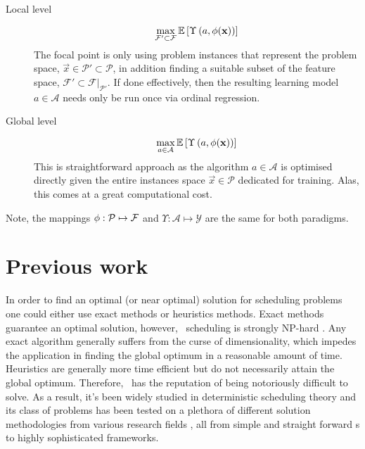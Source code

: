 \begin{description}
  \item[Local level] 
  \begin{equation}
    \max_{\mathcal{F}'\subset\mathcal{F}} 
    \mathbb{E}\left[\Upsilon\left(a,{\mathbf{\phi}}(\mathbf{x})\right)\right]
  \end{equation}
  The  focal point is only using  problem instances that represent the problem 
  space, $\vec{x}\in\mathcal{P'}\subset\mathcal{P}$, in addition finding a 
  suitable subset of the feature space, 
  $\mathcal{F}'\subset\mathcal{F}|_{\mathcal{P}'}$. If done effectively, then 
  the resulting learning model $a\in\mathcal{A}$ needs only be run once via 
  ordinal regression.
  \item[Global level]
  \begin{equation}
    \max_{a\in\mathcal{A}} 
    \mathbb{E}\left[\Upsilon\left(a,{\mathbf{\phi}}(\mathbf{x})\right)\right]
  \end{equation}
  This is  straightforward  approach as the algorithm $a\in\mathcal{A}$ is 
  optimised directly given the entire instances space $\vec{x}\in\mathcal{P}$ 
  dedicated for training. Alas, this comes at a great computational cost.
\end{description}
Note, the mappings ${\mathbf{\phi}}:\mathcal{P}\mapsto\mathcal{F}$ and 
$\Upsilon:\mathcal{A}\mapsto\mathcal{Y}$ are the same for both paradigms.

\section{Previous work}
In order to find an optimal (or near optimal) solution for scheduling problems 
one could either use exact methods or heuristics methods. Exact methods 
guarantee an optimal solution, however, \jsp\ scheduling is strongly NP-hard 
\citep{Garey76:NPhard}. Any exact algorithm generally suffers from the curse of 
dimensionality, which impedes the application in finding the global optimum in 
a reasonable amount of time. Heuristics are generally more time efficient but 
do not necessarily attain the global optimum. Therefore, \JSP\ has the 
reputation of being notoriously difficult to solve. As a result, it's 
been widely studied in deterministic scheduling theory and its class of 
problems has been tested on a plethora of different solution methodologies from 
various research fields \citep{Meeran12}, all from simple and straight forward 
\dr s to highly sophisticated frameworks.


